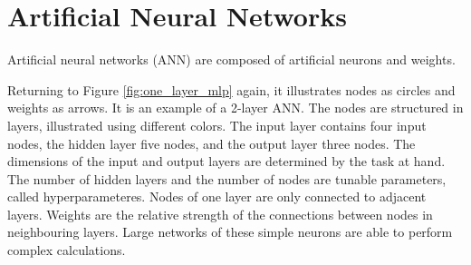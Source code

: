 \documentclass{article}
\begin{document}
\section{Artificial Neural Networks} \label{sec:artificial neural networks}
Artificial neural networks (ANN) are composed of artificial neurons and weights.  

Returning to Figure \ref{fig:one_layer_mlp} again, it illustrates nodes as circles and weights as arrows. It is an example of a 2-layer ANN. The nodes are structured in layers, illustrated using different colors. The input layer contains four input nodes, the hidden layer five nodes, and the output layer three nodes. The dimensions of the input and output layers are determined by the task at hand. The number of hidden layers and the number of nodes are tunable parameters, called hyperparameteres. Nodes of one layer are only connected to adjacent layers. Weights are the relative strength of the connections between nodes in neighbouring layers. %
Large networks of these simple neurons are able to perform complex calculations. 

\end{document}
